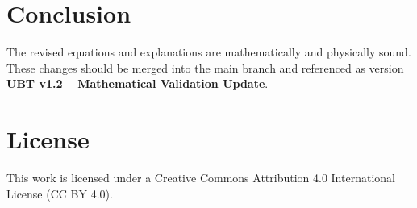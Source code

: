 \documentclass[12pt]{article}
\begin{document}
\section*{Conclusion}
The revised equations and explanations are mathematically and physically sound.  
These changes should be merged into the main branch and referenced as version \textbf{UBT v1.2 – Mathematical Validation Update}.


\section*{License}
This work is licensed under a Creative Commons Attribution 4.0 International License (CC BY 4.0).
\end{document}
